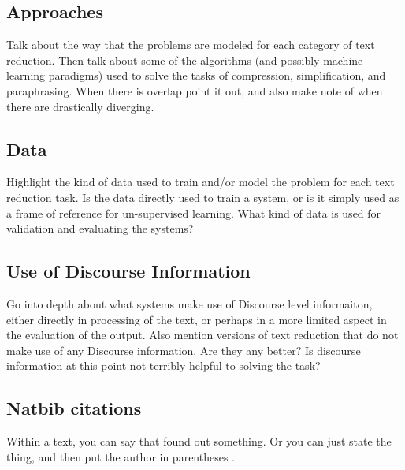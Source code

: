 \subsection{Approaches}
{Talk about the way that the problems are modeled for each category of text reduction. Then talk about some of the algorithms (and possibly machine learning paradigms) used to solve the tasks of compression, simplification, and paraphrasing.  When there is overlap point it out, and also make note of when there are drastically diverging. }


\subsection{Data}

{Highlight the kind of data used to train and/or model the problem for each text reduction task. Is the data directly used to train a system, or is it simply used as a frame of reference for un-supervised learning.  What kind of data is used for validation and evaluating the systems? }

\subsection{Use of Discourse Information}
{Go into depth about what systems make use of Discourse level informaiton, either directly in processing of the text, or perhaps in a more limited aspect in the evaluation of the output.  Also mention versions of text reduction that do not make use of any Discourse information.  Are they any better?  Is discourse information at this point not terribly helpful to solving the task?}

\subsection{Natbib citations}
Within a text, you can say that \citet{lin2001} found out something. Or you can just state the thing, and then put the author in parentheses \citep[see][]{szpektor2004}.